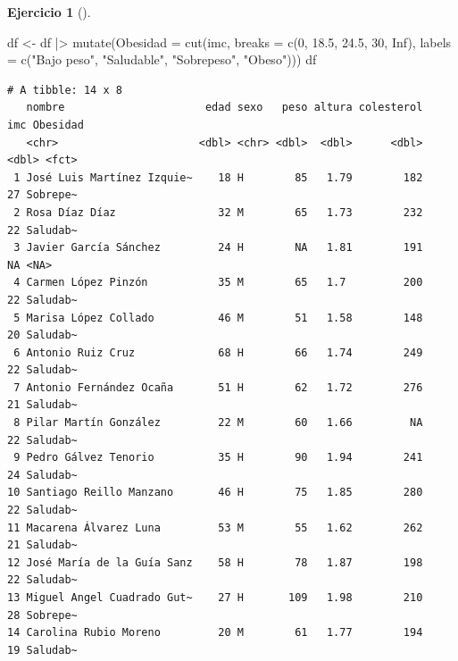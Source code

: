 \documentclass[
  a4paper,
]{scrreport}
\newenvironment{Shaded}{\begin{snugshade}}{\end{snugshade}}
\newcommand{\AttributeTok}[1]{\textcolor[rgb]{0.40,0.45,0.13}{#1}}
\newcommand{\ConstantTok}[1]{\textcolor[rgb]{0.56,0.35,0.01}{#1}}
\newcommand{\DecValTok}[1]{\textcolor[rgb]{0.68,0.00,0.00}{#1}}
\newcommand{\FloatTok}[1]{\textcolor[rgb]{0.68,0.00,0.00}{#1}}
\newcommand{\FunctionTok}[1]{\textcolor[rgb]{0.28,0.35,0.67}{#1}}
\newcommand{\NormalTok}[1]{\textcolor[rgb]{0.00,0.23,0.31}{#1}}
\newcommand{\OtherTok}[1]{\textcolor[rgb]{0.00,0.23,0.31}{#1}}
\newcommand{\SpecialCharTok}[1]{\textcolor[rgb]{0.37,0.37,0.37}{#1}}
\newcommand{\StringTok}[1]{\textcolor[rgb]{0.13,0.47,0.30}{#1}}
\theoremstyle{definition}
\newtheorem{exercise}{Ejercicio}[chapter]
\theoremstyle{remark}
\begin{document}
\begin{exercise}[]
\begin{enumerate}
  \begin{tcolorbox}[enhanced jigsaw, toprule=.15mm, rightrule=.15mm, arc=.35mm, colback=white, colbacktitle=quarto-callout-tip-color!10!white, toptitle=1mm, left=2mm, colframe=quarto-callout-tip-color-frame, opacityback=0, breakable, opacitybacktitle=0.6, bottomtitle=1mm, titlerule=0mm, title=\textcolor{quarto-callout-tip-color}{\faLightbulb}\hspace{0.5em}{Solución}, bottomrule=.15mm, coltitle=black, leftrule=.75mm]

\begin{Shaded}
\begin{Highlighting}[]
\NormalTok{df }\OtherTok{\textless{}{-}}\NormalTok{ df }\SpecialCharTok{|\textgreater{}}
    \FunctionTok{mutate}\NormalTok{(}\AttributeTok{Obesidad =} \FunctionTok{cut}\NormalTok{(imc, }\AttributeTok{breaks =} \FunctionTok{c}\NormalTok{(}\DecValTok{0}\NormalTok{, }\FloatTok{18.5}\NormalTok{, }\FloatTok{24.5}\NormalTok{, }\DecValTok{30}\NormalTok{, }\ConstantTok{Inf}\NormalTok{), }\AttributeTok{labels =} \FunctionTok{c}\NormalTok{(}\StringTok{"Bajo peso"}\NormalTok{, }\StringTok{"Saludable"}\NormalTok{, }\StringTok{"Sobrepeso"}\NormalTok{, }\StringTok{"Obeso"}\NormalTok{)))}
\NormalTok{df}
\end{Highlighting}
\end{Shaded}

\begin{verbatim}
# A tibble: 14 x 8
   nombre                      edad sexo   peso altura colesterol   imc Obesidad
   <chr>                      <dbl> <chr> <dbl>  <dbl>      <dbl> <dbl> <fct>   
 1 José Luis Martínez Izquie~    18 H        85   1.79        182    27 Sobrepe~
 2 Rosa Díaz Díaz                32 M        65   1.73        232    22 Saludab~
 3 Javier García Sánchez         24 H        NA   1.81        191    NA <NA>    
 4 Carmen López Pinzón           35 M        65   1.7         200    22 Saludab~
 5 Marisa López Collado          46 M        51   1.58        148    20 Saludab~
 6 Antonio Ruiz Cruz             68 H        66   1.74        249    22 Saludab~
 7 Antonio Fernández Ocaña       51 H        62   1.72        276    21 Saludab~
 8 Pilar Martín González         22 M        60   1.66         NA    22 Saludab~
 9 Pedro Gálvez Tenorio          35 H        90   1.94        241    24 Saludab~
10 Santiago Reillo Manzano       46 H        75   1.85        280    22 Saludab~
11 Macarena Álvarez Luna         53 M        55   1.62        262    21 Saludab~
12 José María de la Guía Sanz    58 H        78   1.87        198    22 Saludab~
13 Miguel Angel Cuadrado Gut~    27 H       109   1.98        210    28 Sobrepe~
14 Carolina Rubio Moreno         20 M        61   1.77        194    19 Saludab~
\end{verbatim}


\end{tcolorbox}
\end{enumerate}
\end{exercise}
\end{document}
